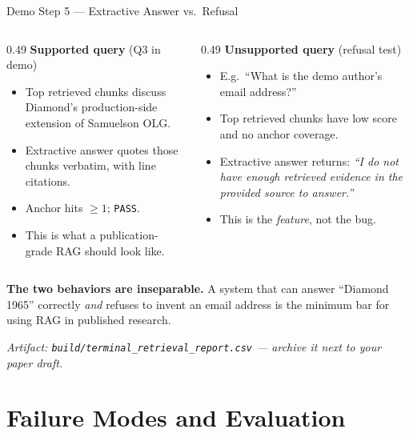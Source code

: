 \begin{frame}{Demo Step 5 --- Extractive Answer vs.\ Refusal}
\begin{columns}[T]
\begin{column}{0.49\textwidth}
\textbf{Supported query} (Q3 in demo)
\begin{itemize}\small
\item Top retrieved chunks discuss Diamond's production-side extension of Samuelson OLG.
\item Extractive answer quotes those chunks verbatim, with line citations.
\item Anchor hits $\geq 1$; \texttt{PASS}.
\item This is what a publication-grade RAG should look like.
\end{itemize}
\end{column}
\begin{column}{0.49\textwidth}
\textbf{Unsupported query} (refusal test)
\begin{itemize}\small
\item E.g.\ ``What is the demo author's email address?''
\item Top retrieved chunks have low score and no anchor coverage.
\item Extractive answer returns: \emph{``I do not have enough retrieved evidence in the provided source to answer.''}
\item This is the \emph{feature}, not the bug.
\end{itemize}
\end{column}
\end{columns}

\vspace{0.2cm}
\begin{takeawaybox}
\textbf{The two behaviors are inseparable.} A system that can answer ``Diamond 1965'' correctly \emph{and} refuses to invent an email address is the minimum bar for using RAG in published research.
\end{takeawaybox}

\vspace{0.1cm}
\centering\textit{Artifact: \texttt{build/terminal\_retrieval\_report.csv} --- archive it next to your paper draft.}
\end{frame}

\section{Failure Modes and Evaluation}


